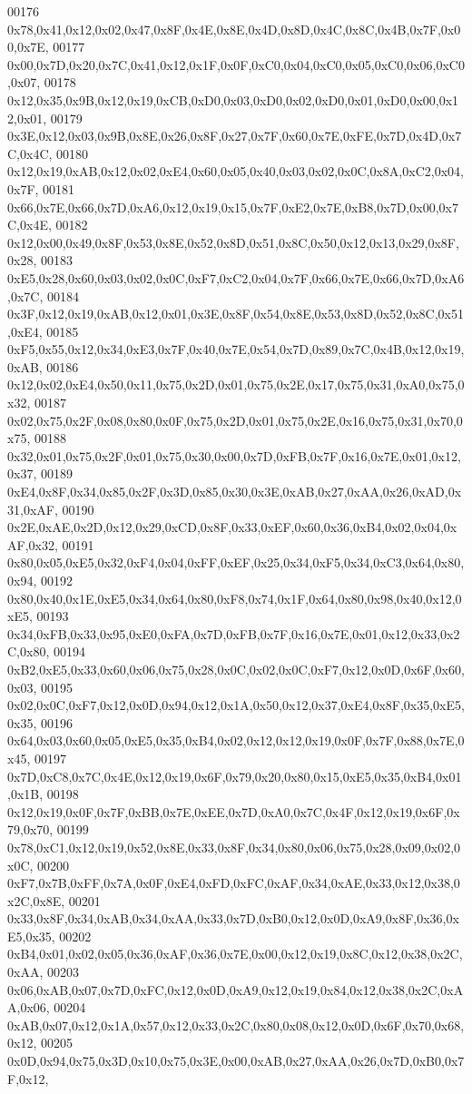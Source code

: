 \begin{DoxyCode}
00176 0x78,0x41,0x12,0x02,0x47,0x8F,0x4E,0x8E,0x4D,0x8D,0x4C,0x8C,0x4B,0x7F,0x00,0x7E,
00177 0x00,0x7D,0x20,0x7C,0x41,0x12,0x1F,0x0F,0xC0,0x04,0xC0,0x05,0xC0,0x06,0xC0,0x07,
00178 0x12,0x35,0x9B,0x12,0x19,0xCB,0xD0,0x03,0xD0,0x02,0xD0,0x01,0xD0,0x00,0x12,0x01,
00179 0x3E,0x12,0x03,0x9B,0x8E,0x26,0x8F,0x27,0x7F,0x60,0x7E,0xFE,0x7D,0x4D,0x7C,0x4C,
00180 0x12,0x19,0xAB,0x12,0x02,0xE4,0x60,0x05,0x40,0x03,0x02,0x0C,0x8A,0xC2,0x04,0x7F,
00181 0x66,0x7E,0x66,0x7D,0xA6,0x12,0x19,0x15,0x7F,0xE2,0x7E,0xB8,0x7D,0x00,0x7C,0x4E,
00182 0x12,0x00,0x49,0x8F,0x53,0x8E,0x52,0x8D,0x51,0x8C,0x50,0x12,0x13,0x29,0x8F,0x28,
00183 0xE5,0x28,0x60,0x03,0x02,0x0C,0xF7,0xC2,0x04,0x7F,0x66,0x7E,0x66,0x7D,0xA6,0x7C,
00184 0x3F,0x12,0x19,0xAB,0x12,0x01,0x3E,0x8F,0x54,0x8E,0x53,0x8D,0x52,0x8C,0x51,0xE4,
00185 0xF5,0x55,0x12,0x34,0xE3,0x7F,0x40,0x7E,0x54,0x7D,0x89,0x7C,0x4B,0x12,0x19,0xAB,
00186 0x12,0x02,0xE4,0x50,0x11,0x75,0x2D,0x01,0x75,0x2E,0x17,0x75,0x31,0xA0,0x75,0x32,
00187 0x02,0x75,0x2F,0x08,0x80,0x0F,0x75,0x2D,0x01,0x75,0x2E,0x16,0x75,0x31,0x70,0x75,
00188 0x32,0x01,0x75,0x2F,0x01,0x75,0x30,0x00,0x7D,0xFB,0x7F,0x16,0x7E,0x01,0x12,0x37,
00189 0xE4,0x8F,0x34,0x85,0x2F,0x3D,0x85,0x30,0x3E,0xAB,0x27,0xAA,0x26,0xAD,0x31,0xAF,
00190 0x2E,0xAE,0x2D,0x12,0x29,0xCD,0x8F,0x33,0xEF,0x60,0x36,0xB4,0x02,0x04,0xAF,0x32,
00191 0x80,0x05,0xE5,0x32,0xF4,0x04,0xFF,0xEF,0x25,0x34,0xF5,0x34,0xC3,0x64,0x80,0x94,
00192 0x80,0x40,0x1E,0xE5,0x34,0x64,0x80,0xF8,0x74,0x1F,0x64,0x80,0x98,0x40,0x12,0xE5,
00193 0x34,0xFB,0x33,0x95,0xE0,0xFA,0x7D,0xFB,0x7F,0x16,0x7E,0x01,0x12,0x33,0x2C,0x80,
00194 0xB2,0xE5,0x33,0x60,0x06,0x75,0x28,0x0C,0x02,0x0C,0xF7,0x12,0x0D,0x6F,0x60,0x03,
00195 0x02,0x0C,0xF7,0x12,0x0D,0x94,0x12,0x1A,0x50,0x12,0x37,0xE4,0x8F,0x35,0xE5,0x35,
00196 0x64,0x03,0x60,0x05,0xE5,0x35,0xB4,0x02,0x12,0x12,0x19,0x0F,0x7F,0x88,0x7E,0x45,
00197 0x7D,0xC8,0x7C,0x4E,0x12,0x19,0x6F,0x79,0x20,0x80,0x15,0xE5,0x35,0xB4,0x01,0x1B,
00198 0x12,0x19,0x0F,0x7F,0xBB,0x7E,0xEE,0x7D,0xA0,0x7C,0x4F,0x12,0x19,0x6F,0x79,0x70,
00199 0x78,0xC1,0x12,0x19,0x52,0x8E,0x33,0x8F,0x34,0x80,0x06,0x75,0x28,0x09,0x02,0x0C,
00200 0xF7,0x7B,0xFF,0x7A,0x0F,0xE4,0xFD,0xFC,0xAF,0x34,0xAE,0x33,0x12,0x38,0x2C,0x8E,
00201 0x33,0x8F,0x34,0xAB,0x34,0xAA,0x33,0x7D,0xB0,0x12,0x0D,0xA9,0x8F,0x36,0xE5,0x35,
00202 0xB4,0x01,0x02,0x05,0x36,0xAF,0x36,0x7E,0x00,0x12,0x19,0x8C,0x12,0x38,0x2C,0xAA,
00203 0x06,0xAB,0x07,0x7D,0xFC,0x12,0x0D,0xA9,0x12,0x19,0x84,0x12,0x38,0x2C,0xAA,0x06,
00204 0xAB,0x07,0x12,0x1A,0x57,0x12,0x33,0x2C,0x80,0x08,0x12,0x0D,0x6F,0x70,0x68,0x12,
00205 0x0D,0x94,0x75,0x3D,0x10,0x75,0x3E,0x00,0xAB,0x27,0xAA,0x26,0x7D,0xB0,0x7F,0x12,

\end{DoxyCode}
